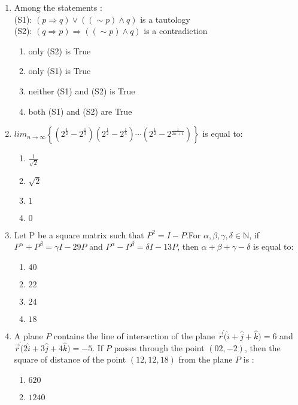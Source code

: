 \documentclass[journal,12pt,onecolumn]{IEEEtran}
\theoremstyle{remark}
\begin{document}
\begin{enumerate}
\item Among the statements : \\      
        (S1): $(p \Rightarrow q) \vee ((\sim p)\wedge q)$ is a tautology\\
        (S2): $(q \Rightarrow p) \Rightarrow ((\sim p)\wedge q)$ is a contradiction
    \begin{enumerate}
        \item only (S2) is True
        \item only (S1) is True
        \item neither (S1) and (S2) is True
        \item both (S1) and (S2) are True
    \end{enumerate}
    \item $lim_{n \to \infty} \left\{ \left( 2^{\frac{1}{2}} -2^{\frac{1}{3}} \right) \left( 2^{\frac{1}{2}} - 2^{\frac{1}{5}} \right) \cdots \left( 2^{\frac{1}{2}} - 2^{\frac{1}{2n+1}} \right) \right\}$ is equal to:
    \begin{enumerate}
        \item $\frac{1}{\sqrt{2}}$
        \item $\sqrt{2}$
        \item $1$
        \item $0$
    \end{enumerate}
    \item Let P be a square matrix such that $P^2 = I-P$.For $\alpha , \beta, \gamma, \delta \in \mathbb{N}$, if  $P^{\alpha}+P^{\beta}=\gamma I-29 P$ and $P^{\alpha}-P^{\beta}=\delta I-13P$, then $\alpha +\beta+ \gamma-\delta$ is equal to: \begin{enumerate}
        \item $40$    
 \item $22$    
        \item $24$     
        \item $18$     
    \end{enumerate}    
   \item A plane $P$ contains the line of intersection of the plane $ \overrightarrow{r} \dot (\hat{i} + \hat{j} + \hat{k}) = 6$ and $\overrightarrow{r} \dot (2\hat{i} + 3\hat{j} + 4\hat{k}) = -5 $. If  $P$ passes through the point  $(0 2, -2)$, then the square of distance of the point $(12, 12, 18)$ from the plane $P$ is :
\begin{enumerate}
        \item $620$                   
        \item $1240$          

\end{enumerate}
\end{enumerate}
\end{document}
